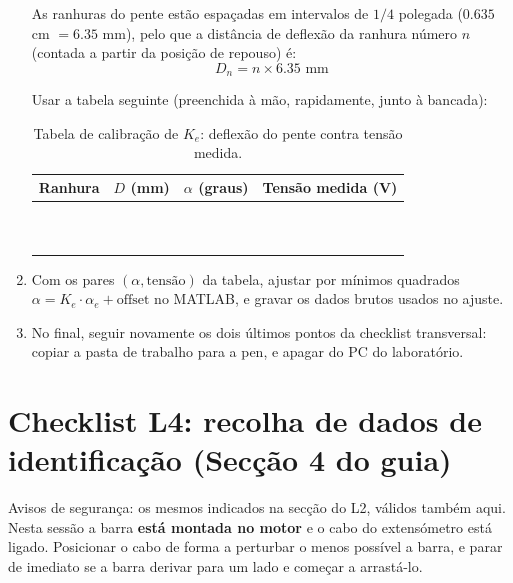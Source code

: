 \documentclass[a4paper,11pt]{article}
\begin{document}
\begin{enumerate}[label=$\square$, leftmargin=1.5em]
  As ranhuras do pente estão espaçadas em intervalos de $1/4$ polegada
  ($0.635$ cm $= 6.35$ mm), pelo que a distância de deflexão da ranhura número $n$
  (contada a partir da posição de repouso) é:
  $$D_n = n \times 6.35 \text{ mm}$$

  Usar a tabela seguinte (preenchida à mão, rapidamente, junto à bancada):

  \begin{table}[H]
    \centering
    \renewcommand{\arraystretch}{2.2}
    \begin{tabular}{|c|c|c|c|}
      \hline
      \textbf{Ranhura} & \textbf{$D$ (mm)} & \textbf{$\alpha$ (graus)} &
      \textbf{Tensão medida (V)} \\
      \hline
       & & & \\
      \hline
       & & & \\
      \hline
       & & & \\
      \hline
       & & & \\
      \hline
       & & & \\
      \hline
       & & & \\
      \hline
       & & & \\
      \hline
       & & & \\
      \hline
       & & & \\
      \hline
       & & & \\
      \hline
    \end{tabular}
    \caption{Tabela de calibração de $K_e$: deflexão do pente contra tensão
    medida.}
  \end{table}

  \item Com os pares $(\alpha, \text{tensão})$ da tabela, ajustar por mínimos
  quadrados $\alpha = K_e \cdot \alpha_e + \text{offset}$ no MATLAB, e gravar os
  dados brutos usados no ajuste.

  \item No final, seguir novamente os dois últimos pontos da checklist
  transversal: copiar a pasta de trabalho para a pen, e apagar do PC do
  laboratório.
\end{enumerate}

\section*{Checklist L4: recolha de dados de identificação (Secção 4 do guia)}

Avisos de segurança: os mesmos indicados na secção do L2, válidos também aqui.
Nesta sessão a barra \textbf{está montada no motor} e o cabo do extensómetro está ligado.
Posicionar o cabo de forma a perturbar o menos possível a barra, e parar de imediato se a barra derivar para um lado e começar a arrastá-lo.
\end{document}
